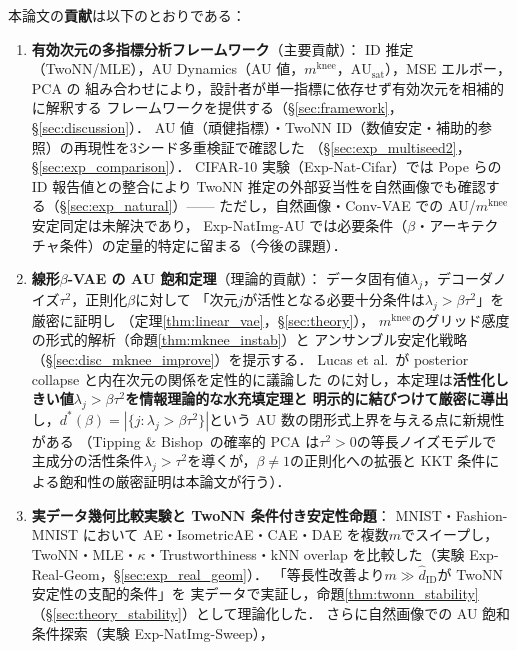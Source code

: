 \documentclass[11pt,a4paper]{jsarticle}
\newcommand{\kap}{\kappa}
\newcommand{\AUsat}{\mathrm{AU}_{\mathrm{sat}}}
\newcommand{\mknee}{m^{\mathrm{knee}}}
\begin{document}
本論文の\textbf{貢献}は以下のとおりである：
\begin{enumerate}
  \item \textbf{有効次元の多指標分析フレームワーク}（主要貢献）：
        ID 推定（TwoNN/MLE），AU Dynamics（AU 値，$\mknee$，$\AUsat$），MSE エルボー，PCA の
        組み合わせにより，設計者が単一指標に依存せず有効次元を相補的に解釈する
        フレームワークを提供する（§\ref{sec:framework}，§\ref{sec:discussion}）．
        AU 値（頑健指標）・TwoNN ID（数値安定・補助的参照）の再現性を3シード多重検証で確認した
        （§\ref{sec:exp_multiseed2}，§\ref{sec:exp_comparison}）．
        CIFAR-10 実験（Exp-Nat-Cifar）では Pope ら\cite{pope2021intrinsic}の ID 報告値との整合により
        TwoNN 推定の外部妥当性を自然画像でも確認する（§\ref{sec:exp_natural}）——
        ただし，自然画像・Conv-VAE での AU/$\mknee$ 安定同定は未解決であり，
        Exp-NatImg-AU では必要条件（$\beta$・アーキテクチャ条件）の定量的特定に留まる（今後の課題）．
  \item \textbf{線形$\beta$-VAE の AU 飽和定理}（理論的貢献）：
        データ固有値$\lambda_j$，デコーダノイズ$\tau^2$，正則化$\beta$に対して
        「次元$j$が活性となる必要十分条件は$\lambda_j > \beta\tau^2$」を厳密に証明し
        （定理\ref{thm:linear_vae}，§\ref{sec:theory}），
        $\mknee$のグリッド感度の形式的解析（命題\ref{thm:mknee_instab}）と
        アンサンブル安定化戦略（§\ref{sec:disc_mknee_improve}）を提示する．
        Lucas et al.~\cite{lucas2019elbo}が posterior collapse と内在次元の関係を定性的に議論した
        のに対し，本定理は\textbf{活性化しきい値$\lambda_j > \beta\tau^2$を情報理論的な水充填定理と
        明示的に結びつけて厳密に導出}し，$d^*(\beta) = |\{j:\lambda_j > \beta\tau^2\}|$という
        AU 数の閉形式上界を与える点に新規性がある
        （Tipping \& Bishop~\cite{tippingbishop1999ppca}の確率的 PCA は$\tau^2 > 0$の等長ノイズモデルで
        主成分の活性条件$\lambda_j > \tau^2$を導くが，$\beta \neq 1$の正則化への拡張と
        KKT 条件による飽和性の厳密証明は本論文が行う）．
  \item \textbf{実データ幾何比較実験と TwoNN 条件付き安定性命題}：
        MNIST・Fashion-MNIST において AE・IsometricAE・CAE・DAE を複数$m$でスイープし，
        TwoNN・MLE・$\kap$・Trustworthiness・kNN overlap を比較した（実験 Exp-Real-Geom，§\ref{sec:exp_real_geom}）．
        「等長性改善より$m \gg \hat{d}_\mathrm{ID}$が TwoNN 安定性の支配的条件」を
        実データで実証し，命題\ref{thm:twonn_stability}（§\ref{sec:theory_stability}）として理論化した．
        さらに自然画像での AU 飽和条件探索（実験 Exp-NatImg-Sweep），

\end{enumerate}
\end{document}
